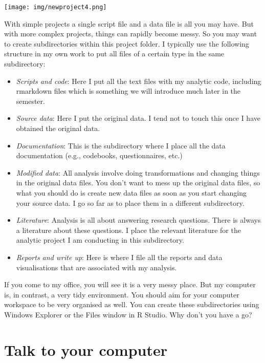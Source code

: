 \documentclass[]{book}
\begin{document}
\texttt{[image: img/newproject4.png]}

With simple projects a single script file and a data file is all you may have. But with more complex projects, things can rapidly become messy. So you may want to create subdirectories within this project folder. I typically use the following structure in my own work to put all files of a certain type in the same subdirectory:

\begin{itemize}
\item
  \emph{Scripts and code}: Here I put all the text files with my analytic code, including rmarkdown files which is something we will introduce much later in the semester.
\item
  \emph{Source data}: Here I put the original data. I tend not to touch this once I have obtained the original data.
\item
  \emph{Documentation}: This is the subdirectory where I place all the data documentation (e.g., codebooks, questionnaires, etc.)
\item
  \emph{Modified data}: All analysis involve doing transformations and changing things in the original data files. You don't want to mess up the original data files, so what you should do is create new data files as soon as you start changing your source data. I go so far as to place them in a different subdirectory.
\item
  \emph{Literature}: Analysis is all about answering research questions. There is always a literature about these questions. I place the relevant literature for the analytic project I am conducting in this subdirectory.
\item
  \emph{Reports and write up}: Here is where I file all the reports and data visualisations that are associated with my analysis.
\end{itemize}

If you come to my office, you will see it is a very messy place. But my computer is, in contrast, a very tidy environment. You should aim for your computer workspace to be very organised as well. You can create these subdirectories using Windows Explorer or the Files window in R Studio. Why don't you have a go?

\hypertarget{talk-to-your-computer}{%
\section{Talk to your computer}\label{talk-to-your-computer}}
\end{document}
